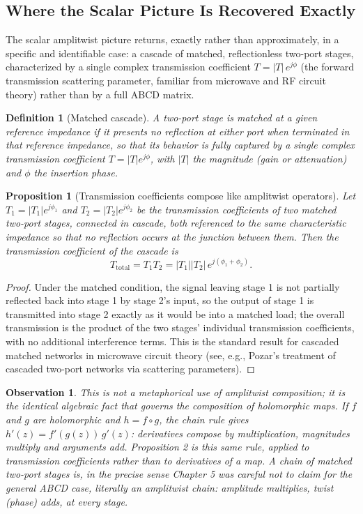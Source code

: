 \documentclass[12pt]{article}
\newtheorem{definition}{Definition}
\newtheorem{proposition}{Proposition}
\newtheorem{observation}{Observation}
\begin{document}
\subsection{Where the Scalar Picture Is Recovered Exactly}

The scalar amplitwist picture returns, exactly rather than approximately, in a specific and identifiable case: a cascade of matched, reflectionless two-port stages, characterized by a single complex transmission coefficient $T = |T|\,e^{j\phi}$ (the forward transmission scattering parameter, familiar from microwave and RF circuit theory) rather than by a full ABCD matrix.

\begin{definition}[Matched cascade]
A two-port stage is \emph{matched} at a given reference impedance if it presents no reflection at either port when terminated in that reference impedance, so that its behavior is fully captured by a single complex transmission coefficient $T = |T|e^{j\phi}$, with $|T|$ the magnitude (gain or attenuation) and $\phi$ the insertion phase.
\end{definition}

\begin{proposition}[Transmission coefficients compose like amplitwist operators]
Let $T_1 = |T_1|e^{j\phi_1}$ and $T_2 = |T_2|e^{j\phi_2}$ be the transmission coefficients of two matched two-port stages, connected in cascade, both referenced to the same characteristic impedance so that no reflection occurs at the junction between them. Then the transmission coefficient of the cascade is
\[
T_{\text{total}} = T_1 T_2 = |T_1||T_2|\, e^{j(\phi_1 + \phi_2)}.
\]
\end{proposition}

\begin{proof}
Under the matched condition, the signal leaving stage 1 is not partially reflected back into stage 1 by stage 2's input, so the output of stage 1 is transmitted into stage 2 exactly as it would be into a matched load; the overall transmission is the product of the two stages' individual transmission coefficients, with no additional interference terms. This is the standard result for cascaded matched networks in microwave circuit theory (see, e.g., Pozar's treatment of cascaded two-port networks via scattering parameters).
\end{proof}

\begin{observation}
This is not a metaphorical use of amplitwist composition; it is the identical algebraic fact that governs the composition of holomorphic maps. If $f$ and $g$ are holomorphic and $h = f \circ g$, the chain rule gives $h'(z) = f'(g(z))\, g'(z)$: derivatives compose by multiplication, magnitudes multiply and arguments add. Proposition 2 is this same rule, applied to transmission coefficients rather than to derivatives of a map. A chain of matched two-port stages is, in the precise sense Chapter 5 was careful not to claim for the general ABCD case, literally an amplitwist chain: amplitude multiplies, twist (phase) adds, at every stage.
\end{observation}
\end{document}
